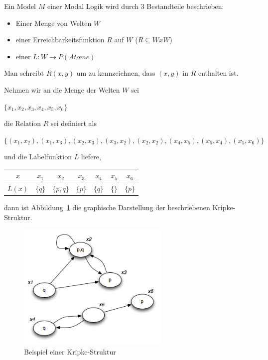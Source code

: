 \begin{definition}
	\label{def:model}
	Ein Model $M$ einer Modal Logik wird durch 3 Bestandteile beschrieben:
	\begin{itemize}
		\item Einer Menge von Welten $W$
		\item einer Erreichbarkeitsfunktion $R$ auf $W$ ($R \subseteq WxW$)
		\item einer  $L : W \rightarrow P(Atome)$
	\end{itemize}
	
	Man schreibt $R(x,y)$ um zu kennzeichnen, dass $(x,y)$ in $R$ enthalten ist.
	
\end{definition}
\cite[S.309]{huth2004logic}


Nehmen wir an die Menge der Welten $W$ sei 
\begin{center}
	$\{ x_1, x_2, x_3, x_4, x_5, x_6 \}$
\end{center}
 
die Relation $R$ sei definiert als 
\begin{center}
	$\{(x_1, x_2), (x_1, x_3), (x_2, x_3), (x_3, x_2), (x_2, x_2), (x_4, x_5), (x_5, x_4), (x_5, x_6)\}$ 
\end{center}

und die Labelfunktion $L$ liefere,
\begin{center}
	\begin{tabular}{c|cccccc}
		$x$ & $x_1$ & $x_2$ & $x_3$ & $x_4$ & $x_5$ & $x_6$\\
		\hline
		$L(x)$ & $\{q\}$ & $\{p,q\}$ & $\{p\}$ & $\{q\}$ & $\{\}$ & $\{p\}$
	\end{tabular}
\end{center}

dann ist Abbildung~\ref{fig:mmKripke01} die graphische Darstellung der beschriebenen Kripke-Struktur.

\begin{figure}[ht]
	\begin{center}
  	\includegraphics[width=0.65\textwidth]{./Images/Kripke01.png}
  	\caption{Beispiel einer Kripke-Struktur}
		\label{fig:mmKripke01}
	\end{center}
\end{figure}

